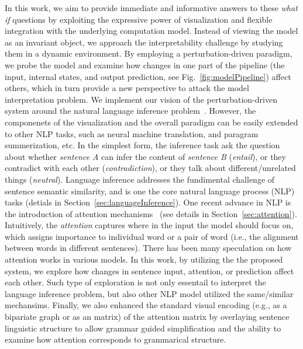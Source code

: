 In this work, we aim to provide immediate and informative answers to these \emph{what if} questions by exploiting the expressive power of visualization and flexible integration with the underlying computation model. Instead of viewing the model as an invariant object, we approach the interpretability challenge by studying them in a dynamic environment. By employing a perturbation-driven paradigm, we probe the model and examine how changes in one part of the pipeline (the input, internal states, and output prediction, see Fig.~\ref{fig:modelPipeline}) affect others, which in turn provide a new perspective to attack the model interpretation problem.
%
We implement our vision of the perturbation-driven system around the natural language inference problem~\cite{Parikh2016}.
%
However, the componenets of the visualization and the overall paradigm can be easily extended to other NLP tasks, such as neural machine translation, and paragram summerization, etc.
%
In the simplest form, the inference task ask the question about whether \emph{sentence A} can infer the content of \emph{sentence B} (\emph{entail}), or they contradict with each other (\emph{contradiction}), or they talk about different/unrelated things (\emph{neutral}). Language inference addresses the fundimental challenge of sentence semantic similarity, and is one the core natural language process (NLP) tasks (detials in Section~\ref{sec:languageInference}).
%
One recent advance in NLP is the introduction of attention mechanisms~\cite{VaswaniShazeerParmar2017} (see details in Section~\ref{sec:attention}). Intuitively, the \emph{attention} captures where in the input the model should focus on, which assigns importance to individual word or a pair of word (i.e., the alignment between words in different sentences).
%
There has been many speculation on how attention works in various models. In this work, by utilizing the the proposed system, we explore how changes in sentence input, attention, or prediction affect each other. Such type of exploration is not only essentail to interpret the language inference problem, but also other NLP model utilized the same/similar mechansims.
%
Finally, we also enhanced the standard visual encoding (e.g., as a bipariate graph or as an matrix) of the attention matrix by overlaying sentence linguistic structure to allow grammar guided simplification and the ability to examine how attention corresponds to grammarical structure.
%

